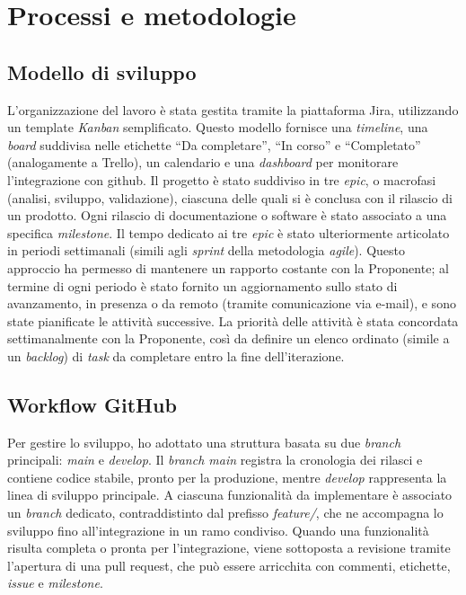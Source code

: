 \chapter{Processi e metodologie}
\label{cap:processi-metodologie}

\section{Modello di sviluppo}

\par L’organizzazione del lavoro è stata gestita tramite la piattaforma Jira, utilizzando un template \textit{Kanban} semplificato. Questo modello fornisce una \textit{timeline}, una \textit{board} suddivisa nelle etichette “Da completare”, “In corso” e “Completato” (analogamente a Trello), un calendario e una \textit{dashboard} per monitorare l’integrazione con \gls{github}. Il progetto è stato suddiviso in tre \textit{epic}, o macrofasi (analisi, sviluppo, validazione), ciascuna delle quali si è conclusa con il rilascio di un prodotto. Ogni rilascio di documentazione o software è stato associato a una specifica \textit{milestone}. Il tempo dedicato ai tre \textit{epic} è stato ulteriormente articolato in periodi settimanali (simili agli \textit{sprint} della metodologia \textit{agile}). Questo approccio ha permesso di mantenere un rapporto costante con la Proponente; al termine di ogni periodo è stato fornito un aggiornamento sullo stato di avanzamento, in presenza o da remoto (tramite comunicazione via e-mail), e sono state pianificate le attività successive. La priorità delle attività è stata concordata settimanalmente con la Proponente, così da definire un elenco ordinato (simile a un \textit{backlog}) di \textit{task} da completare entro la fine dell’iterazione.

\section{Workflow GitHub}

\par Per gestire lo sviluppo, ho adottato una struttura basata su due \textit{branch} principali: \textit{main} e \textit{develop}. Il \textit{branch main} registra la cronologia dei rilasci e contiene codice stabile, pronto per la produzione, mentre \textit{develop} rappresenta la linea di sviluppo principale. A ciascuna funzionalità da implementare è associato un \textit{branch} dedicato, contraddistinto dal prefisso \textit{feature/}, che ne accompagna lo sviluppo fino all’integrazione in un ramo condiviso. Quando una funzionalità risulta completa o pronta per l’integrazione, viene sottoposta a revisione tramite l’apertura di una \gls{pull request}, che può essere arricchita con commenti, etichette, \textit{issue} e \textit{milestone}.

